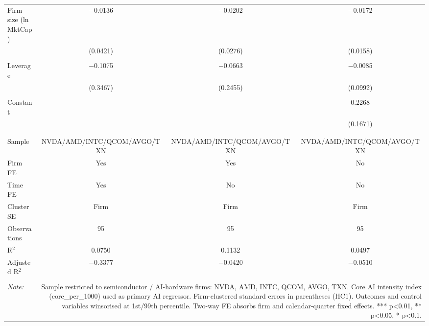 \begin{table}[!htbp]
\begin{tabular}{@{\extracolsep{5pt}}lccc}
 Firm size (ln MktCap) & $-$0.0136 & $-$0.0202 & $-$0.0172 \\ 
  & (0.0421) & (0.0276) & (0.0158) \\ 
  & & & \\ 
 Leverage & $-$0.1075 & $-$0.0663 & $-$0.0085 \\ 
  & (0.3467) & (0.2455) & (0.0992) \\ 
  & & & \\ 
 Constant &  &  & 0.2268 \\ 
  &  &  & (0.1671) \\ 
  & & & \\ 
\hline \\[-1.8ex] 
Sample & NVDA/AMD/INTC/QCOM/AVGO/TXN & NVDA/AMD/INTC/QCOM/AVGO/TXN & NVDA/AMD/INTC/QCOM/AVGO/TXN \\ 
Firm FE & Yes & Yes & No \\ 
Time FE & Yes & No & No \\ 
Cluster SE & Firm & Firm & Firm \\ 
Observations & 95 & 95 & 95 \\ 
R$^{2}$ & 0.0750 & 0.1132 & 0.0497 \\ 
Adjusted R$^{2}$ & $-$0.3377 & $-$0.0420 & $-$0.0510 \\ 
\hline 
\hline \\[-1.8ex] 
\textit{Note:}  & \multicolumn{3}{r}{Sample restricted to semiconductor / AI-hardware firms: NVDA, AMD, INTC, QCOM, AVGO, TXN. Core AI intensity index (core_per_1000) used as primary AI regressor. Firm-clustered standard errors in parentheses (HC1). Outcomes and control variables winsorised at 1st/99th percentile. Two-way FE absorbs firm and calendar-quarter fixed effects. *** p<0.01, ** p<0.05, * p<0.1.} \\ 
\end{tabular} 
\end{table} 
